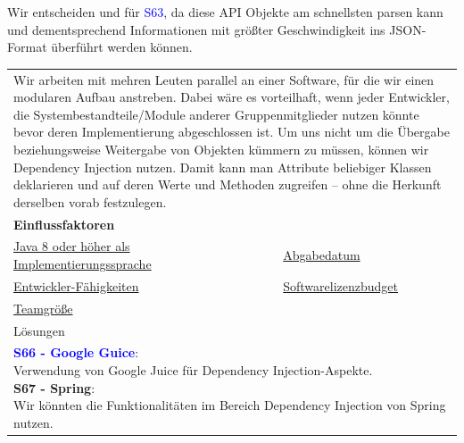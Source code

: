 \documentclass[enabledeprecatedfontcommands,fontsize=11pt,paper=a4,twoside]{scrartcl}
\newcounter{one}
\newcommand{\cb}[1]{{\textcolor{blue}{#1}}}
\begin{document}
	\begin{onehalfspace}
		Wir entscheiden und für \cb{S63}, da diese API Objekte am schnellsten parsen kann und dementsprechend Informationen mit größter Geschwindigkeit ins JSON-Format überführt werden können.
	\end{onehalfspace}
	\newpage
	
	\newpage
	\begin{tabular} {|p{8cm} p{8cm}|}
		\hline
		\rowcolor{prob}\multicolumn{2}{|l|}{\parbox{16cm}{\textbf{26: Dependency Injection}}} \\  \hline\hline 
		\multicolumn{2}{|l|}{\parbox{16cm}{Wir arbeiten mit mehren Leuten parallel an einer Software, für die wir einen modularen Aufbau anstreben. Dabei wäre es vorteilhaft, wenn jeder Entwickler, die Systembestandteile/Module anderer Gruppenmitglieder nutzen könnte bevor deren Implementierung abgeschlossen ist. Um uns nicht um die Übergabe beziehungsweise Weitergabe von Objekten kümmern zu müssen, können wir Dependency Injection nutzen. Damit kann man Attribute beliebiger Klassen deklarieren und auf deren Werte und Methoden zugreifen – ohne die Herkunft derselben vorab festzulegen.}}\rule{0pt}{10ex}\\ [7ex] \hline
		\multicolumn{2}{|l|}{\textbf{Einflussfaktoren}}\\
		\hyperlink{b}{Java 8 oder höher als Implementierungssprache} &  \hyperlink {uu}{Abgabedatum} \\
		\hyperlink {vv}{Entwickler-Fähigkeiten} &
		\hyperlink {ww}{Softwarelizenzbudget} \\
		\hyperlink {xx}{Teamgröße} &
		\\ \hline
		\multicolumn{2}{|l|}{Lösungen} \\
		\multicolumn{2}{|l|}{\parbox{16cm}{
				\textbf{\cb{\hypertarget{guice}{S66 - Google Guice}}}: \\
				Verwendung von Google Juice für Dependency Injection-Aspekte.\\
				\textbf{S67 - Spring}: \\
				Wir könnten die Funktionalitäten im Bereich Dependency Injection von Spring nutzen.
		} }\\ [6ex] \hline
	\end{tabular}\\ \\ \\
\end{document}
